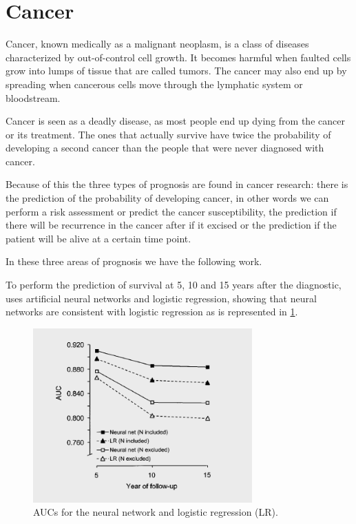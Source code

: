   \section{Cancer}
 \label{section:cancer}
 
Cancer, known medically as a malignant neoplasm, is a class of diseases characterized by out-of-control 
cell growth. It becomes harmful when faulted cells grow into lumps of tissue that are called tumors. The
 cancer may also end up by spreading when cancerous cells move through the lymphatic system or bloodstream.

Cancer is seen as a deadly disease, as most people end up dying from the cancer or its treatment. The ones 
that actually survive have twice the probability of developing a second cancer than the people that were never
 diagnosed with cancer. \cite{Rheingold2000}

Because of this the three types of prognosis are found in cancer research: there is the prediction of the
 probability of developing cancer, in other words we can perform a risk assessment or predict the cancer susceptibility,
 the prediction if there will be recurrence in the cancer after if it excised or the prediction if the patient will 
 be alive at a certain time point. 

In these three areas of prognosis we have the following work.

To perform the prediction of survival at 5, 10 and 15 years after the diagnostic, \cite{Lundin1999} uses artificial
 neural networks and logistic regression, showing that neural networks are consistent with logistic regression as is  represented in \ref{fig:LRvsNN}. 

\begin{figure}[!htb]
  \centering
  \includegraphics[width=0.75\textwidth]{Figures/LRvsNN.png}
  \caption{AUCs for the neural network and logistic regression (LR).}
  \label{fig:LRvsNN}
\end{figure}

